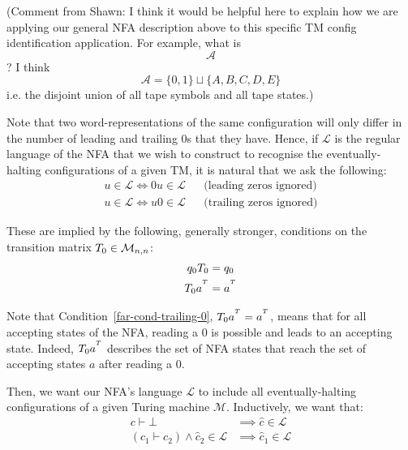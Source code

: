 (Comment from Shawn: I think it would be helpful here to explain how we are applying our general NFA description above to this specific TM config identification application. For example, what is $$\mathcal{A}$$? I think $$\mathcal{A} = \{0, 1\} \sqcup \{A, B, C, D, E\}$$ i.e. the disjoint union of all tape symbols and all tape states.)

Note that two word-representations of the same configuration will only differ in the number of leading and trailing 0s that they have. Hence, if $\mathcal{L}$ is the regular language of the NFA that we wish to construct to recognise the eventually-halting configurations of a given TM, it is natural that we ask the following:
\begin{align*}
  u \in \mathcal{L} \iff 0u \in \mathcal{L} &  & \text{(leading zeros ignored)}
  \\
  u \in \mathcal{L} \iff u0 \in \mathcal{L} &  & \text{(trailing zeros ignored)}
\end{align*}

These are implied by the following, generally stronger, conditions on the transition matrix $T_0 \in \mathcal{M}_{n,n}$:
\begin{align}
  q_0 T_0    & = q_0
  \label{far-cond-leading-0}
  \\
  T_0 a^{^T} & = a^{^T}
  \label{far-cond-trailing-0}
\end{align}


Note that Condition~\ref{far-cond-trailing-0}, $T_0 a^{^T} = a^{^T}$, means that for all accepting states of the NFA, reading a 0 is possible and leads to an accepting state. Indeed, $T_0 a^{^T}$ describes the set of NFA states that reach the set of accepting states $a$ after reading a $0$.


Then, we want our NFA's language $\mathcal{L}$ to include all eventually-halting configurations of a given Turing machine $\mathcal{M}$.  Inductively, we want that:
\begin{align*}
  c\vdash\bot                                    & \implies \hat{c} \in \mathcal{L}  \\
  (c_1\vdash c_2)\land \hat{c}_2 \in \mathcal{L} & \implies\hat{c}_1 \in \mathcal{L}
\end{align*}

